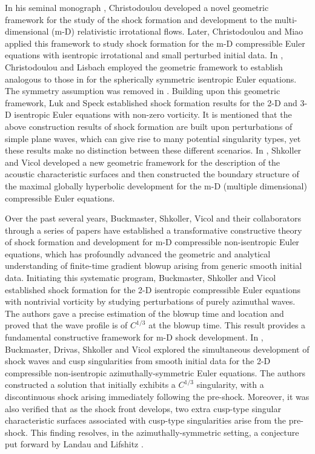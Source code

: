 \documentclass[11pt,reqno]{article}
\numberwithin{equation}{section}
\begin{document}
In his seminal monograph \cite{Chr1}, Christodoulou developed a novel geometric framework for the study of the shock formation and development to the multi-dimensional (m-D) relativistic irrotational flows. Later, Christodoulou and Miao \cite{CM} applied this framework to study shock formation for the m-D compressible Euler equations with isentropic irrotational and small perturbed initial data. In \cite{CL}, Christodoulou and Lisbach employed the geometric framework to establish analogous to those in \cite{Yin} for the spherically symmetric isentropic Euler equations. The symmetry assumption was removed in \cite{Chr2}. Building upon this geometric framework,
Luk and Speck \cite{LS1, LS2} established shock formation results for the 2-D and 3-D isentropic Euler equations with non-zero vorticity. It is mentioned that the above construction results of shock formation are built upon perturbations of simple plane waves, which can give rise to many potential singularity types, yet these results make no distinction between these different scenarios.
In \cite{SV}, Shkoller and Vicol developed a new geometric framework for the description of the acoustic characteristic surfaces and then constructed the boundary structure of the maximal globally hyperbolic development for the m-D (multiple dimensional) compressible Euler equations.

Over the past several years, Buckmaster, Shkoller, Vicol and their collaborators through a series of papers \cite{BI, BDSV, BSV1, BSV2, BSV3, NRSV, NSV1, NSV2} have established a transformative constructive theory of shock formation and development for m-D compressible non-isentropic Euler equations, which has profoundly advanced the geometric and analytical understanding of finite-time gradient blowup arising from generic smooth initial data.
Initiating this systematic program, Buckmaster, Shkoller and Vicol \cite{BSV1} established shock formation for the 2-D isentropic compressible Euler equations with nontrivial vorticity by studying perturbations of purely azimuthal waves. The authors gave
a precise estimation of the blowup time and location and proved that the wave profile is of $C^{1/3}$ at the blowup time. This result provides a fundamental constructive framework for m-D shock development. In \cite{BDSV}, Buckmaster, Drivas, Shkoller and Vicol
explored the simultaneous development of shock waves and cusp singularities from smooth initial data for the 2-D compressible non-isentropic azimuthally-symmetric Euler equations.
The authors constructed a solution that initially exhibits a $C^{1/3}$ singularity, with a discontinuous shock arising immediately following the pre-shock. Moreover, it was also verified that as the shock front develops, two extra cusp-type singular characteristic surfaces associated with cusp-type singularities arise from the pre-shock. This finding resolves, in the azimuthally-symmetric setting, a conjecture put forward by Landau and Lifshitz \cite{LL}.
\end{document}
